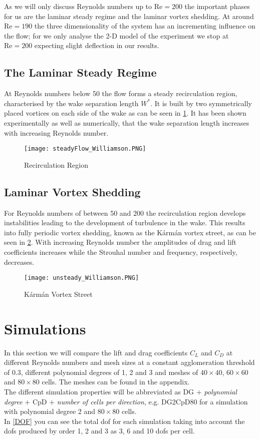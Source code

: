 	As we will only discuss Reynolds numbers up to $\text{Re} = 200$ the important phases for us are the laminar steady regime and the laminar vortex shedding. At around $\text{Re} = 190$ the three dimensionality of the system has an incrementing influence on the flow; for we only analyse the 2-D model of the experiment we stop at $\text{Re} = 200$ expecting slight deflection in our results.
	
	\subsection{The Laminar Steady Regime}
	
	At Reynolds numbers below 50 the flow forms a steady recirculation region, characterised by the wake separation length  $W^*$. It is built by two symmetrically placed vortices on each side of the wake as can be seen in \cref{fig:steady}. It has been shown experimentally as well as numerically, that the wake separation length increases with increasing Reynolds number. 
		\begin{figure}[htp]
			\centering
			\texttt{[image: steadyFlow\_Williamson.PNG]}
			\caption{Recirculation Region \cite{williamson1996vortex}}
			\label{fig:steady}
		\end{figure}
	\subsection{Laminar Vortex Shedding}
	For Reynolds numbers of between 50 and 200 the recirculation region develops instabilities leading to the development of turbulence in the wake. This results into fully periodic vortex shedding, known as the Kármán vortex street, as can be seen in \cref{fig:unsteady}. With increasing Reynolds number the amplitudes of drag and lift coefficients increases while the Strouhal number and frequency, respectively, decreases.
	
		\begin{figure}[htp]
			\centering
			\texttt{[image: unsteady\_Williamson.PNG]}
			\caption{Kármán Vortex Street \cite{williamson1996vortex}}
			\label{fig:unsteady}
		\end{figure}
		
\section{Simulations}
	In this section we will compare the lift and drag coefficients $C_L$ and $C_D$ at different Reynolds numbers and mesh sizes at a constant agglomeration threshold of $0.3$, different polynomial degrees of 1, 2 and 3 and meshes of $40 \times 40$, $60 \times 60$ and $80 \times 80$ cells. The meshes can be found in the appendix. \\\indent
	The different simulation properties will be abbreviated as DG $+$ \textit{polynomial degree} $+$ CpD $+$ \textit{number of cells per direction}, e.g. DG2CpD80 for a simulation with polynomial degree 2 and $80 \times 80$ cells.\\
	In \cref{DOF} you can see the total \gls{dof} for each simulation taking into account the \gls{dof}s produced by order 1, 2 and 3 as 3, 6 and 10 \gls{dof}s per cell.
	
